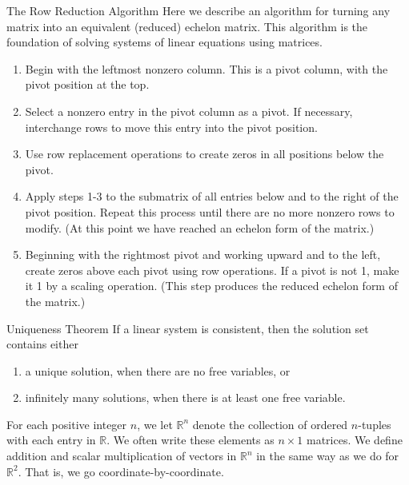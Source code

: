 \begin{custombox}{The Row Reduction Algorithm}
    Here we describe an algorithm for turning any matrix into an equivalent
    (reduced) echelon matrix. This algorithm is the foundation of solving systems of linear equations using matrices.

    \begin{enumerate}
        \item Begin with the leftmost nonzero column. This is a pivot column, with the pivot position at the top.
        \item Select a nonzero entry in the pivot column as a pivot. If necessary, interchange rows to move this entry into the pivot position.
        \item Use row replacement operations to create zeros in all positions below the pivot.
        \item Apply steps 1-3 to the submatrix of all entries below and to the right of the pivot position. Repeat this process until there are no more nonzero rows to modify. (At this point we have reached an echelon form of the matrix.)
        \item Beginning with the rightmost pivot and working upward and to the left, create zeros above each pivot using row operations. If a pivot is not 1, make it 1 by a scaling operation. (This step produces the reduced echelon form of the matrix.)
    \end{enumerate}

\end{custombox}

\begin{theorem}{Uniqueness Theorem}
    If a linear system is consistent, then the solution set contains either
    \begin{enumerate}[label=(\roman*)]
        \item a unique solution, when there are no free variables, or
        \item infinitely many solutions, when there is at least one free variable.
    \end{enumerate}
\end{theorem}


\begin{definition}
    For each positive integer $n$, we let $\mathbb{R}^n$ denote the collection of ordered $n$-tuples with each entry in $\mathbb{R}$. We often write these elements as $n \times 1$ matrices. We define addition and scalar multiplication of vectors in $\mathbb{R}^n$ in the same way as we do for $\mathbb{R}^2$. That is, we go coordinate-by-coordinate.
\end{definition}


